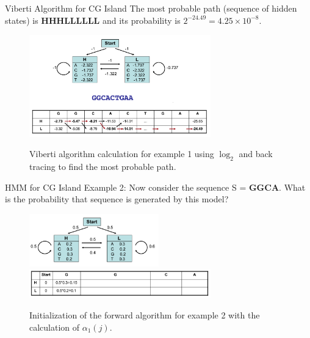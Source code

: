 \documentclass{beamer}
\begin{document}
\begin{frame}{Viberti Algorithm for CG Island}
	 The most probable path (sequence of hidden states) is \textbf{HHHLLLLLL} and its probability is $2^{-24.49} = 4.25 \times 10^{-8}$.
	\begin{figure}
		\centering
		\includegraphics[width = 0.7\textwidth]{example1cal.png}
		\label{fig:example2cal}
		\caption{Viberti algorithm calculation for example 1 using $\log_2$ and back tracing to find the most probable path.}
	\end{figure}
\end{frame}

\begin{frame}{HMM for CG Island}
	Example 2: Now consider the sequence  S = \textbf{GGCA}. What is the probability that sequence is generated by this model?
	\begin{figure}
		\centering
		\includegraphics[width = 0.5\textwidth]{example1.png}
		\includegraphics[width = 0.7\textwidth]{example2cal1.png}
		\caption{Initialization of the forward algorithm for example 2 with the calculation of $\alpha_1(j)$.}
	\end{figure}
	
\end{frame}
\end{document}

